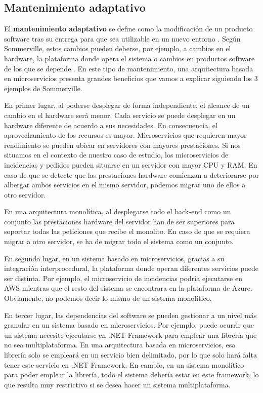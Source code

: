 \documentclass[11pt,spanish,listoffigures]{tfgetsinf}
\begin{document}
\subsection{Mantenimiento adaptativo}

El \textbf{mantenimiento adaptativo} se define como la modificación de un producto software tras su entrega para que sea utilizable en un nuevo entorno \cite{Bourque2014}. Según Sommerville, estos cambios pueden deberse, por ejemplo, a cambios en el hardware, la plataforma donde opera el sistema o cambios en productos software de los que se depende \cite{Sommerville2010}. En este tipo de mantenimiento, una arquitectura basada en microservicios presenta grandes beneficios que vamos a explicar siguiendo los 3 ejemplos de Sommerville.

En primer lugar, al poderse desplegar de forma independiente, el alcance de un cambio en el hardware será menor. Cada servicio se puede desplegar en un hardware diferente de acuerdo a sus necesidades. En consecuencia, el aprovechamiento de los recursos es mayor. Microservicios que requieren mayor rendimiento se pueden ubicar en servidores con mayores prestaciones. Si nos situamos en el contexto de nuestro caso de estudio, los microservicios de incidencias y pedidos pueden situarse en un servidor con mayor CPU y RAM. En caso de que se detecte que las prestaciones hardware comienzan a deteriorarse por albergar ambos servicios en el mismo servidor, podemos migrar uno de ellos a otro servidor. 

En una arquitectura monolítica, al desplegarse todo el back-end como un conjunto las prestaciones hardware del servidor han de ser superiores para soportar todas las peticiones que recibe el monolito. En caso de que se requiera migrar a otro servidor, se ha de migrar todo el sistema como un conjunto.

En segundo lugar, en un sistema basado en microservicios, gracias a su integración interprocedural, la plataforma donde operan diferentes servicios puede ser distinta. Por ejemplo, el microservicio de incidencias podría ejecutarse en AWS mientras que el resto del sistema se encontrara en la plataforma de Azure. Obviamente, no podemos decir lo mismo de un sistema monolítico.

En tercer lugar, las dependencias del software se pueden gestionar a un nivel más granular en un sistema basado en microservicios. Por ejemplo, puede ocurrir que un sistema necesite ejecutarse en .NET Framework para emplear una librería que no sea multiplataforma. En una arquitectura basada en microservicios, esa librería solo se empleará en un servicio bien delimitado, por lo que solo hará falta tener este servicio en .NET Framework. En cambio, en un sistema monolítico para poder emplear la librería, todo el sistema debería estar en este framework, lo que resulta muy restrictivo si se desea hacer un sistema multiplataforma.
\end{document}

